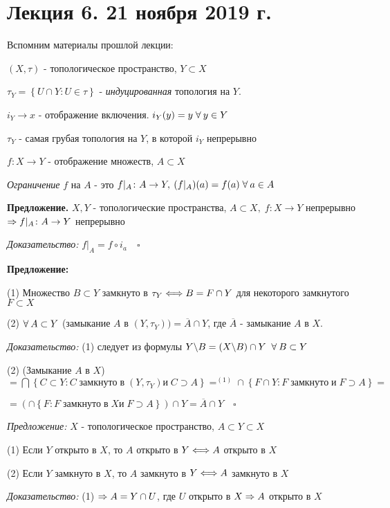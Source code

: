 \documentclass[../../main.tex]{subfiles}
\begin{document}
\section{Лекция 6. 21 ноября 2019 г.}


Вспомним материалы прошлой лекции:

$(X, \tau)$ - топологическое пространство, $Y \subset X$

$\tau_Y= \left\{U \cap Y \colon U \in \tau \right\}$ - \textit{индуцированная} топология на $Y$.

$i_Y \to x$ - отображение включения. $i_Y(y) = y \; \forall\: y \in Y$

$\tau_Y$ - самая грубая топология на $Y$, в которой $i_Y$ непрерывно

$f \colon X \to Y$ - отображение множеств, $A \subset X$

 \textit{Ограничение} $f$ на $A$ - это  $f|_A \colon A \to Y, \: (f|_A)(a) = f(a) \; \forall\: a \in A$

\textbf{Предложение.} $X,Y$ - топологические пространства, $A \subset X,\; f \colon X \to Y$ непрерывно $\Rightarrow f|_A \colon A \to Y$ непрерывно

\textit{Доказательство:} $f|_A = f \circ i_a \quad \square$

\textbf{Предложение:} 

(1) Множество $B \subset Y$ замкнуто в $\tau_Y \Longleftrightarrow B = F \cap Y$ для некоторого замкнутого $F \subset X$

(2) $\forall\: A \subset Y$ (замыкание $A$ в $(Y, \tau_Y))  = \overline{A} \cap Y$, где $\overline{A}$ - замыкание $A$ в $X$. 

\textit{Доказательство:} (1) следует из формулы $Y \backslash B = (X \backslash B) \cap Y \;\; \forall\: B \subset Y$

(2) (Замыкание $A$ в $X$) $ = \bigcap \left\{C \subset Y \colon C \; замкнуто \; в \; (Y, \tau_Y) и \; C \supset A \right\} =^{(1)} \cap \left\{F \cap Y \colon F\; замкнуто \; и \; F \supset A \right\}  =   $

$= \left( \cap \left\{ F \colon F \; замкнуто \; в \; X и \; F \supset A \right\} \right) \cap Y = \overline{A} \cap Y \quad \square$

\textit{Предложение:} $X$ - топологическое пространство, $A \subset Y \subset X$

(1) Если $Y$ открыто в $X$, то $A$ открыто в $Y \Longleftrightarrow A$ открыто в $X$

(2) Если $Y$ замкнуто в $X$, то $A$ замкнуто в $Y \Longleftrightarrow A$ замкнуто в $X$

\textit{Доказательство:} (1) $\Rightarrow A = Y \cap U$, где $U$ открыто в $X \Rightarrow A$ открыто в $X$
\end{document}
